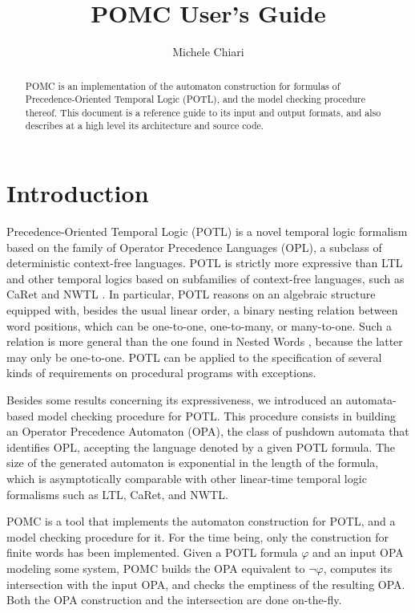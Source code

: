\documentclass{article}
\title{POMC User's Guide}
\author{Michele Chiari}
\date{}
\begin{document}
\maketitle

\begin{abstract}
POMC is an implementation of the automaton construction for formulas
of Precedence-Oriented Temporal Logic (POTL), and the model checking
procedure thereof.
This document is a reference guide to its input and output formats,
and also describes at a high level its architecture and source code.
\end{abstract}

\section{Introduction}

Precedence-Oriented Temporal Logic (POTL) \cite{ChiariMP19} is a novel temporal
logic formalism based on the family of Operator Precedence Languages (OPL),
a subclass of deterministic context-free languages.
POTL is strictly more expressive than LTL and other temporal logics based
on subfamilies of context-free languages, such as CaRet \cite{AlurEM04}
and NWTL \cite{lmcs/AlurABEIL08}.
In particular, POTL reasons on an algebraic structure equipped with,
besides the usual linear order, a binary nesting relation between word positions,
which can be one-to-one, one-to-many, or many-to-one.
Such a relation is more general than the one found in Nested Words \cite{jacm/AlurM09},
because the latter may only be one-to-one.
POTL can be applied to the specification of several kinds of requirements
on procedural programs with exceptions.

Besides some results concerning its expressiveness,
we introduced an automata-based model checking procedure for POTL.
This procedure consists in building an Operator Precedence Automaton (OPA),
the class of pushdown automata that identifies OPL,
accepting the language denoted by a given POTL formula.
The size of the generated automaton is exponential in the length of the formula,
which is asymptotically comparable with other linear-time temporal logic
formalisms such as LTL, CaRet, and NWTL.

POMC is a tool that implements the automaton construction
for POTL, and a model checking procedure for it.
For the time being, only the construction for finite words has been implemented.
Given a POTL formula $\varphi$ and an input OPA modeling some system,
POMC builds the OPA equivalent to $\neg \varphi$, computes its intersection
with the input OPA, and checks the emptiness of the resulting OPA.
Both the OPA construction and the intersection are done on-the-fly.
\end{document}

